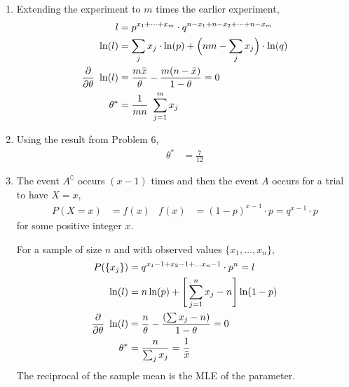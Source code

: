 \begin{enumerate}
    \item Extending the experiment to $ m $ times the earlier experiment,
          \begin{align}
              l        & = p^{x_1 + \dots + x_m} \cdot q^{n-x_1 + n-x_2 + \dots
              + n-x_m}                                                               \\
              \ln(l)   & = \sum_j x_j \cdot \ln(p) + \Big(nm - \sum_j x_j\Big) \cdot
              \ln(q)                                                                 \\
              \diffp*{\ \ln(l)}{\theta}
                       & = \frac{m\bar{x}}{\theta} - \frac{m(n-\bar{x})}{1-\theta}
              = 0                                                                    \\
              \theta^* & = \frac{1}{mn}\ \sum_{j=1}^{m} x_j
          \end{align}

    \item Using the result from Problem 6,
          \begin{align}
              \theta^* & = \frac{7}{12}
          \end{align}

    \item The event $ A^\complement $ occurs $ (x-1) $ times and then the event $ A $
          occurs for a trial to have $ X = x $,
          \begin{align}
              P(X = x) & = f(x)                                  &
              f(x)     & = (1-p)^{x-1} \cdot p = q^{x-1} \cdot p
          \end{align}
          for some positive integer $ x $. \par
          For a sample of size $ n $ and with observed values $ \{x_1,\dots,x_n\} $,
          \begin{align}
              P(\{x_j\}) & = q^{x_1-1 + x_2-1 + \dots x_n-1} \cdot p^n = l          \\
              \ln(l)     & = n\ln(p) + \Bigg[\sum_{j=1}^{n} x_j - n\Bigg] \ln(1-p)  \\
              \diffp*{\ \ln(l)}{\theta}
                         & = \frac{n}{\theta} - \frac{(\sum x_j - n)}{1-\theta} = 0 \\
              \theta^*   & = \frac{n}{\sum_j x_j} = \frac{1}{\bar{x}}
          \end{align}
          The reciprocal of the sample mean is the MLE of the parameter.


\end{enumerate}
